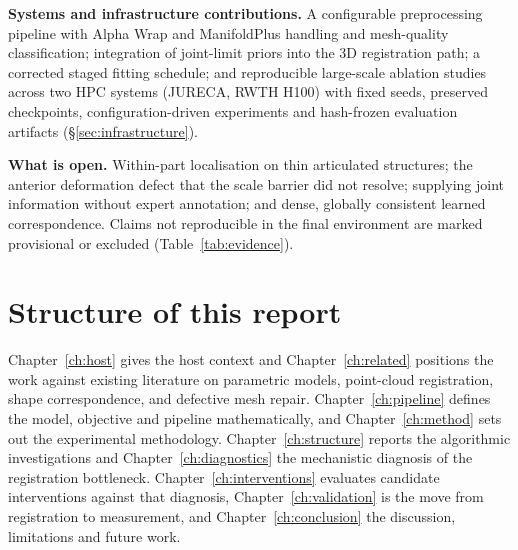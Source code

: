 \textbf{Systems and infrastructure contributions.} A configurable
preprocessing pipeline with Alpha Wrap and ManifoldPlus handling and
mesh-quality classification; integration of joint-limit priors into the 3D
registration path; a corrected staged fitting schedule; and reproducible
large-scale ablation studies across two HPC systems (JURECA, RWTH H100) with
fixed seeds, preserved checkpoints, configuration-driven experiments and
hash-frozen evaluation artifacts (\S\ref{sec:infrastructure}).

\textbf{What is open.} Within-part localisation on thin articulated
structures; the anterior deformation defect that the scale barrier did not
resolve; supplying joint information without expert annotation; and dense,
globally consistent learned correspondence. Claims not reproducible in the
final environment are marked provisional or excluded (Table~\ref{tab:evidence}).

\section{Structure of this report}

Chapter~\ref{ch:host} gives the host context and Chapter~\ref{ch:related}
positions the work against existing literature on parametric models,
point-cloud registration, shape correspondence, and defective mesh repair.
Chapter~\ref{ch:pipeline} defines the model, objective and pipeline
mathematically, and Chapter~\ref{ch:method} sets out the experimental
methodology. Chapter~\ref{ch:structure} reports the algorithmic
investigations and Chapter~\ref{ch:diagnostics} the mechanistic diagnosis of
the registration bottleneck. Chapter~\ref{ch:interventions} evaluates
candidate interventions against that diagnosis, Chapter~\ref{ch:validation}
is the move from registration to measurement, and Chapter~\ref{ch:conclusion}
the discussion, limitations and future work.

